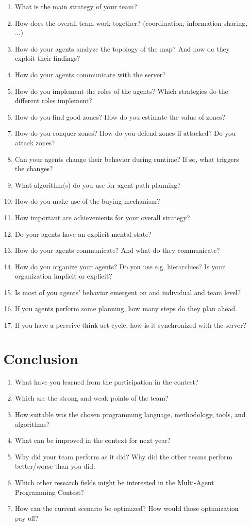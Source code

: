 \documentclass{llncs}
\begin{document}
\begin{enumerate}
 \item What is the main strategy of your team?
 \item How does the overall team work together? (coordination, information
   sharing, ...)
\item How do your agents analyze the topology of the map? And how do they exploit their findings?
\item How do your agents communicate with the server?
\item How do you implement the roles of the agents? Which strategies do the different roles implement?
\item How do you find good zones? How do you estimate the value of zones?
\item How do you conquer zones? How do you defend zones if attacked?
Do you attack zones?
\item Can your agents change their behavior during runtime? If so, what triggers
the changes?
\item What algorithm(s) do you use for agent path planning?
\item How do you make use of the buying-mechanism?
\item How important are achievements for your overall strategy?
\item Do your agents have an explicit mental state?
\item How do your agents communicate? And what do they communicate?
\item How do you organize your agents? Do you use e.g. hierarchies? Is your
organization implicit or explicit?
\item Is most of you agents' behavior emergent on and individual and team level?
\item If you agents perform some planning, how many steps do they plan ahead.
\item If you have a perceive-think-act cycle, how is it synchronized with the server?
\end{enumerate}

\section{Conclusion}
\begin{enumerate}
\item What have you learned from the participation in the contest?
\item Which are the strong and weak points of the team?
\item How suitable was the chosen programming language, methodology,
  tools, and algorithms?
\item What can be improved in the context for next year?
\item Why did your team perform as it did? Why did the other teams perform better/worse than you did.
\item Which other research fields might be interested in the Multi-Agent Programming Contest?
\item How can the current scenario be optimized? How would those optimization pay off?
\end{enumerate}
\end{document}
